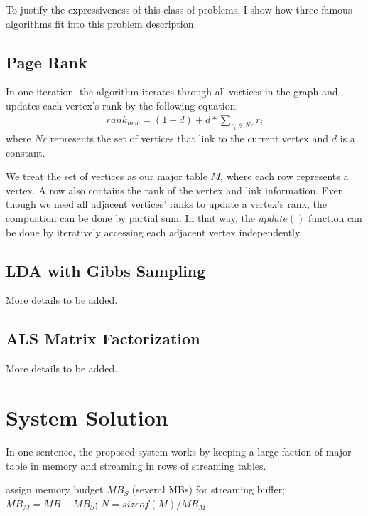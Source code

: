 \documentclass[10pt, twocolumn, a4paper]{article}
\begin{document}
To justify the expressiveness of this class of problems, I show how three famous algorithms fit into this problem description.

\subsection{Page Rank}
In one iteration, the algorithm iterates through all vertices in the graph and updates each vertex's rank by the following equation:
\begin{align*}
rank_{new} = (1 - d) + d*\sum_{r_i \in Nr}r_i
\end{align*}
where $Nr$ represents the set of vertices that link to the current vertex and $d$ is a constant. 

We treat the set of vertices as our major table $M$, where each row represents a vertex. A row also contains the rank of the vertex and link information. Even though we need all adjacent vertices' ranks to update a vertex's rank, the compuation can be done by partial sum. In that way, the $update()$ function can be done by iteratively accessing each adjacent vertex independently.

\subsection{LDA with Gibbs Sampling}

More details to be added.

\subsection{ALS Matrix Factorization}

More details to be added.

\section{System Solution}
\label{sec:system}

In one sentence, the proposed system works by keeping a large faction of major table in memory and streaming in rows of streaming tables.

\begin{algorithm}
  assign memory budget $MB_S$ (several MBs) for streaming buffer;
  $MB_M = MB - MB_S$;
  $N = sizeof(M)/MB_M$
\end{algorithm}
\end{document}
